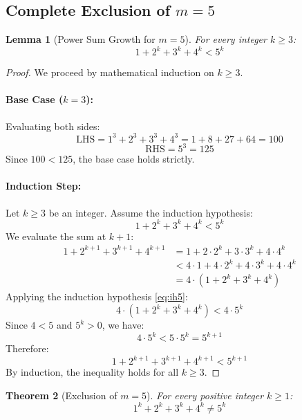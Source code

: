 \documentclass[11pt,a4paper]{article}
\newtheorem{theorem}{Theorem}[section]
\newtheorem{lemma}[theorem]{Lemma}
\theoremstyle{definition}
\begin{document}
\subsection{Complete Exclusion of $m = 5$}

\begin{lemma}[Power Sum Growth for $m = 5$]\label{lem:m5_growth}
For every integer $k \ge 3$:
\begin{equation}\label{eq:m5_ineq}
1 + 2^k + 3^k + 4^k < 5^k
\end{equation}
\end{lemma}

\begin{proof}
We proceed by mathematical induction on $k \ge 3$.

\paragraph{Base Case ($k = 3$):}
Evaluating both sides:
\[ \text{LHS} = 1^3 + 2^3 + 3^3 + 4^3 = 1 + 8 + 27 + 64 = 100 \]
\[ \text{RHS} = 5^3 = 125 \]
Since $100 < 125$, the base case holds strictly.

\paragraph{Induction Step:}
Let $k \ge 3$ be an integer. Assume the induction hypothesis:
\begin{equation}\label{eq:ih5}
1 + 2^k + 3^k + 4^k < 5^k
\end{equation}
We evaluate the sum at $k+1$:
\begin{align*}
1 + 2^{k+1} + 3^{k+1} + 4^{k+1} &= 1 + 2 \cdot 2^k + 3 \cdot 3^k + 4 \cdot 4^k \\
&< 4 \cdot 1 + 4 \cdot 2^k + 4 \cdot 3^k + 4 \cdot 4^k \\
&= 4 \cdot (1 + 2^k + 3^k + 4^k)
\end{align*}
Applying the induction hypothesis \eqref{eq:ih5}:
\[ 4 \cdot (1 + 2^k + 3^k + 4^k) < 4 \cdot 5^k \]
Since $4 < 5$ and $5^k > 0$, we have:
\[ 4 \cdot 5^k < 5 \cdot 5^k = 5^{k+1} \]
Therefore:
\[ 1 + 2^{k+1} + 3^{k+1} + 4^{k+1} < 5^{k+1} \]
By induction, the inequality holds for all $k \ge 3$.
\end{proof}

\begin{theorem}[Exclusion of $m = 5$]\label{thm:m5_exclusion}
For every positive integer $k \ge 1$:
\begin{equation}\label{eq:m5_no_sol}
1^k + 2^k + 3^k + 4^k \ne 5^k
\end{equation}
\end{theorem}
\end{document}
